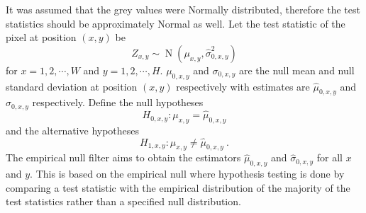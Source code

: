 \documentclass{article}
\DeclareMathOperator{\normal}{N}
\begin{document}
It was assumed that the grey values were Normally distributed, therefore the test statistics should be approximately Normal as well. Let the test statistic of the pixel at position $(x,y)$ be
\begin{equation}
Z_{x,y}\sim\normal(\mu_{x,y},\widehat{\sigma}_{0,x,y}^2)
\end{equation}
for $x=1,2,\cdots,W$ and $y=1,2,\cdots,H$. $\mu_{0,x,y}$ and $\sigma_{0,x,y}$ are the null mean and null standard deviation at position $(x,y)$ respectively with estimates are $\widehat{\mu}_{0,x,y}$ and $\widehat{\sigma}_{0,x,y}$ respectively. Define the null hypotheses
\begin{equation}
  H_{0,x,y}:\mu_{x,y}=\widehat{\mu}_{0,x,y}
\end{equation}
and the alternative hypotheses
\begin{equation}
  H_{1,x,y}:\mu_{x,y}\neq\widehat{\mu}_{0,x,y} \ .
\end{equation}
The empirical null filter aims to obtain the estimators $\widehat{\mu}
_{0,x,y}$ and $\widehat{\sigma}_{0,x,y}$ for all $x$ and $y$. This is based on the empirical null \citep{efron2004large} where hypothesis testing is done by comparing a test statistic with the empirical distribution of the majority of the test statistics rather than a specified null distribution.
\end{document}
